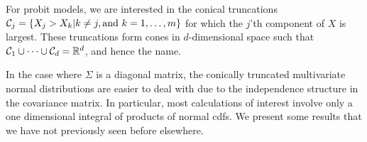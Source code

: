 For probit models, we are interested in the conical truncations ${\mathcal C}_j = \{ X_j > X_k | k\neq j, \text{and } k=1,\dots,m  \}$ for which the $j$'th component of $X$ is largest.
These truncations form cones in $d$-dimensional space such that ${\mathcal C}_1 \cup \cdots \cup {\mathcal C}_d = \mathbb{R}^d$, and hence the name.


In the case where $\Sigma$ is a diagonal matrix, the conically truncated multivariate normal distributions are easier to deal with due to the independence structure in the covariance matrix.
In particular, most calculations of interest involve only a one dimensional integral of products of normal cdfs.
We present some results that we have not previously seen before elsewhere.

